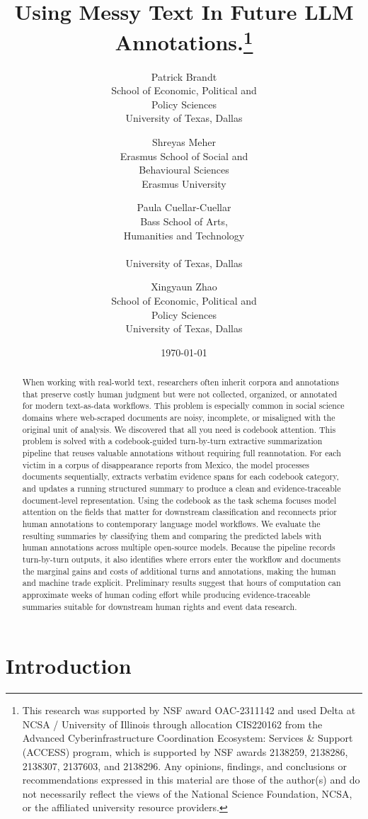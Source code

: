 \documentclass{article}
\title{Using Messy Text In  Future LLM Annotations.\footnote{This research was supported by NSF award OAC-2311142 and 
used Delta at NCSA / University of Illinois through allocation CIS220162 from the Advanced Cyberinfrastructure Coordination Ecosystem: Services \& Support (ACCESS) program, which is supported by NSF awards 2138259, 2138286, 2138307, 2137603, and 2138296. Any opinions, findings, and conclusions or recommendations expressed
in this material are those of the author(s) and do not necessarily
reflect the views of the National Science Foundation,  NCSA, or the
affiliated university resource providers.}}
\author{Patrick Brandt \\ School of Economic, Political and \\ Policy Sciences \\ University of Texas, Dallas\\ \email{pbrandt@utdallas.edu}
\and Shreyas Meher \\ Erasmus School of Social and\\ Behavioural Sciences\\ Erasmus University \\
\email{meher@essb.eur.nl}
\and Paula Cuellar-Cuellar \\ Bass School of Arts, \\ Humanities and Technology \\ \email{email}  \\ University of Texas, Dallas\\
\and Xingyaun Zhao \\ School of Economic, Political and \\ Policy Sciences \\ University of Texas, Dallas\\ \email{email}}
\date{\today}
\begin{document}
\maketitle
\begin{abstract}



When working with real-world text, researchers often inherit corpora and annotations that preserve costly human judgment but were not collected, organized, or annotated for modern text-as-data workflows. This problem is especially common in social science domains where web-scraped documents are noisy, incomplete, or misaligned with the original unit of analysis.
We discovered that all you need is codebook attention. This problem is solved with a codebook-guided turn-by-turn extractive summarization pipeline that reuses valuable annotations without requiring full reannotation. For each victim in a corpus of disappearance reports from Mexico, the model processes documents sequentially, extracts verbatim evidence spans for each codebook category, and updates a running structured summary to produce a clean and evidence-traceable document-level representation. Using the codebook as the task schema focuses model attention on the fields that matter for downstream classification and reconnects prior human annotations to contemporary language model workflows. We evaluate the resulting summaries by classifying them and comparing the predicted labels with human annotations across multiple open-source models. Because the pipeline records turn-by-turn outputs, it also identifies where errors enter the workflow and documents the marginal gains and costs of additional turns and annotations, making the human and machine trade explicit. Preliminary results suggest that hours of computation can approximate weeks of human coding effort while producing evidence-traceable summaries suitable for downstream human rights and event data research.

\end{abstract}

\section{Introduction}\label{introduction}
\end{document}
